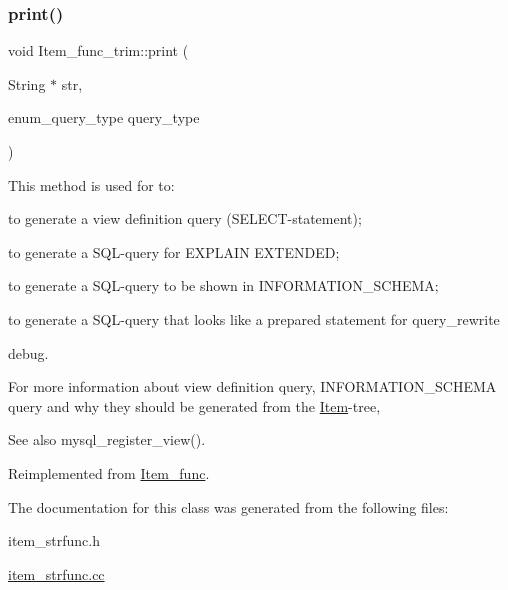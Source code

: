 \subsubsection{\texorpdfstring{print()}{print()}}
{\footnotesize\ttfamily void Item\+\_\+func\+\_\+trim\+::print (\begin{DoxyParamCaption}\item[{String $\ast$}]{str,  }\item[{enum\+\_\+query\+\_\+type}]{query\+\_\+type }\end{DoxyParamCaption})\hspace{0.3cm}{\ttfamily [virtual]}}

This method is used for to\+:
\begin{DoxyItemize}
\item to generate a view definition query (S\+E\+L\+E\+CT-\/statement);
\item to generate a S\+QL-\/query for E\+X\+P\+L\+A\+IN E\+X\+T\+E\+N\+D\+ED;
\item to generate a S\+QL-\/query to be shown in I\+N\+F\+O\+R\+M\+A\+T\+I\+O\+N\+\_\+\+S\+C\+H\+E\+MA;
\item to generate a S\+QL-\/query that looks like a prepared statement for query\+\_\+rewrite
\item debug.
\end{DoxyItemize}

For more information about view definition query, I\+N\+F\+O\+R\+M\+A\+T\+I\+O\+N\+\_\+\+S\+C\+H\+E\+MA query and why they should be generated from the \mbox{\hyperlink{classItem}{Item}}-\/tree, \begin{DoxySeeAlso}{See also}
mysql\+\_\+register\+\_\+view(). 
\end{DoxySeeAlso}


Reimplemented from \mbox{\hyperlink{classItem__func_afb302ee25d4721ace27d3f5053d4ee41}{Item\+\_\+func}}.



The documentation for this class was generated from the following files\+:\begin{DoxyCompactItemize}
\item 
item\+\_\+strfunc.\+h\item 
\mbox{\hyperlink{item__strfunc_8cc}{item\+\_\+strfunc.\+cc}}\end{DoxyCompactItemize}
